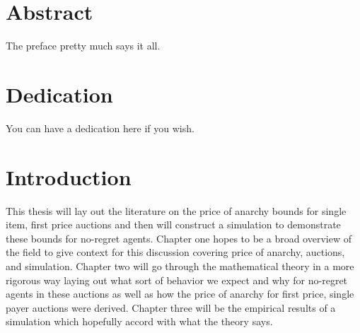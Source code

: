 \documentclass[12pt,twoside]{reedthesis}
\begin{document}
    \tableofcontents
    \listoftables
    \listoffigures

    \chapter*{Abstract}
	The preface pretty much says it all.
	
	\chapter*{Dedication}
	You can have a dedication here if you wish.

  \mainmatter %
  \pagestyle{fancyplain} %


    \chapter*{Introduction}

\doublespacing
	
	This thesis will lay out the literature on the price of anarchy bounds for single item, first price auctions and then will construct a simulation to demonstrate these bounds for no-regret agents. Chapter one hopes to be a broad overview of the field to give context for this discussion covering price of anarchy, auctions, and simulation. Chapter two will go through the mathematical theory in a more rigorous way laying out what sort of behavior we expect and why for no-regret agents in these auctions as well as how the price of anarchy for first price, single payer auctions were derived. Chapter three will be the empirical results of a simulation which hopefully accord with what the theory says. 
	
\end{document}
